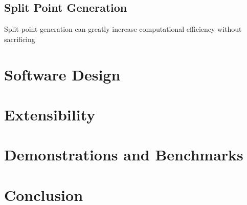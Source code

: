 \documentclass[a4paper, 11pt]{article}
\begin{document}



\subsection{Split Point Generation}

Split point generation can greatly increase computational efficiency without sacrificing 





\section{Software Design}

\section{Extensibility}

\section{Demonstrations and Benchmarks}

\section{Conclusion}


\end{document}
